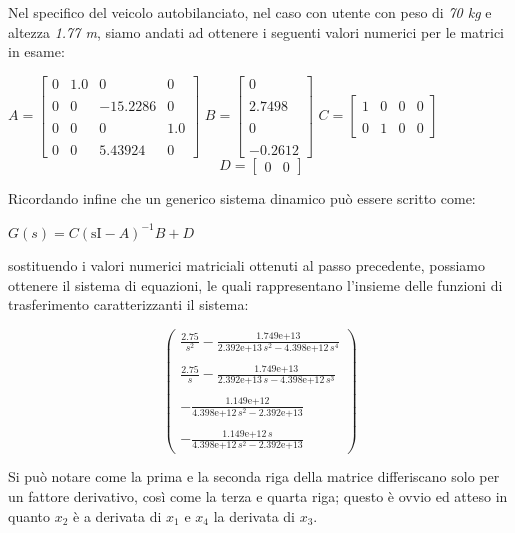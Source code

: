 Nel specifico del veicolo autobilanciato, nel caso con utente con peso di \textit{70 kg} e altezza \textit{1.77 m}, siamo andati ad ottenere i seguenti valori numerici per le matrici in esame:

\begin{center}
	$
	A=\left\lbrack
	\begin{array}{cccc}
		0  & 1.0  & 0  & 0 \\\\
		0 & 0 & -15.2286 & 0 \\\\
		0  & 0  & 0  & 1.0 \\\\
		0  & 0  & 5.43924 & 0
	\end{array}\right\rbrack
	$
	$
	B=\left\lbrack \begin{array}{c}
		0 \\\\
		2.7498 \\\\
		0 \\\\
		-0.2612 
	\end{array}\right\rbrack
	$
	$
	C=\left\lbrack 
	\begin{array}{cccc}
		1  & 0 & 0 & 0 \\\\
		0  & 1 & 0  & 0
	\end{array}\right\rbrack
	$
	$$
	\;D=\left\lbrack 
	\begin{array}{cc}
		0 & 0
	\end{array}\right\rbrack
	$$
\end{center}


Ricordando infine che un generico sistema dinamico può essere scritto come:

\begin{center}
	$
	G\left(s\right)=C {\left(\mathrm{sI}-A\right)}^{-1} B+D
	$
\end{center}
sostituendo i valori numerici matriciali ottenuti al passo precedente, possiamo ottenere il sistema di equazioni, le quali rappresentano l'insieme delle funzioni di trasferimento caratterizzanti il sistema:

\begin{center}
		$$
		\left(\begin{array}{c}
		\frac{2.75}{s^2 }-\frac{\text{1.749e+13}}{\text{2.392e+13}\,s^2 -\text{4.398e+12}\,s^4 }\\ \\
		\frac{2.75}{s}-\frac{\text{1.749e+13}}{\text{2.392e+13}\,s-\text{4.398e+12}\,s^3 }\\ \\
		-\frac{\text{1.149e+12}}{\text{4.398e+12}\,s^2 -\text{2.392e+13}}\\ \\
		-\frac{\text{1.149e+12}\,s}{\text{4.398e+12}\,s^2 -\text{2.392e+13}}
		\end{array}\right)
		$$
\end{center}
Si può notare come la prima e la seconda riga della matrice differiscano solo per un fattore derivativo, così come la terza e quarta riga; questo è ovvio ed atteso in quanto $x_2$ è a derivata di $x_1$ e $x_4$ la derivata di $x_3$.

